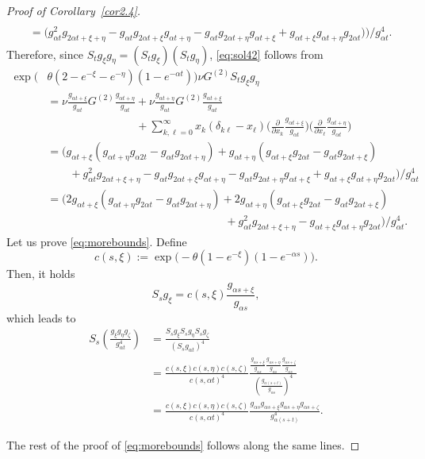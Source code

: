 \documentclass[10pt,a4paper]{amsart}
\begin{document}
\begin{proof}[Proof of Corollary~\ref{cor2.4}]
\begin{align*}
  \\ & = \Big(g_{\alpha t}^2 g_{2\alpha t+\xi+\eta} - g_{\alpha t} g_{2\alpha t+\xi} g_{\alpha t + \eta} - g_{\alpha t} g_{2\alpha t+\eta}g_{\alpha t + \xi} + g_{\alpha t +\xi}g_{\alpha t + \eta}g_{2\alpha t})\Big) / g_{\alpha t}^4.
\end{align*}
Therefore, since $S_t g_{ \xi} g_{ \eta} = (S_t g_{ \xi})(S_t g_{ \eta})$, \eqref{eq:sol42} follows from
\begin{align*}
    \exp\Big( & \theta(2 - e^{- \xi} - e^{- \eta})(1 - e^{-\alpha t}) \Big) \nu G^{(2)}S_t g_{ \xi} g_{ \eta}  \\ & = \nu\frac{g_{\alpha t + \xi}}{g_{\alpha t}} G^{(2)} \frac{g_{\alpha t + \eta}}{g_{\alpha t}} + \nu\frac{g_{\alpha t + \eta}}{g_{\alpha t}} G^{(2)} \frac{g_{\alpha t + \xi}}{g_{\alpha t}} \\ & \qquad \qquad \qquad \qquad + \sum_{k,\ell=0}^\infty 
    x_k(\delta_{k\ell} - x_\ell) \Big(\frac{\partial}{\partial x_k}\frac{g_{\alpha t + \xi}}{g_{\alpha t}} \Big) \Big(\frac{\partial}{\partial x_\ell} \frac{g_{\alpha t + \eta}}{g_{\alpha t}}\Big)
    \\ & = 
    \Big(g_{\alpha t + \xi}(g_{\alpha t + \eta}g_{\alpha 2t} - g_{\alpha t}g_{2\alpha t + \eta}) + g_{\alpha t + \eta} (g_{\alpha t + \xi}g_{2\alpha t} - g_{\alpha t}g_{2\alpha t+\xi}) \\ & \qquad + g_{\alpha t}^2 g_{2\alpha t+\xi+\eta} - g_{\alpha t} g_{2\alpha t+\xi}g_{\alpha t + \eta} - g_{\alpha t} g_{2\alpha t+\eta}g_{\alpha t + \xi} + g_{\alpha t +\xi}g_{\alpha t + \eta}g_{2\alpha t}\Big)/g_{\alpha t}^4 \\ & = \Big(
    2g_{\alpha t + \xi}(g_{\alpha t + \eta}g_{2\alpha t} - g_{\alpha t}g_{2\alpha t + \eta}) + 2g_{\alpha t + \eta}(g_{\alpha t + \xi}g_{2\alpha t} - g_{\alpha t}g_{2\alpha t+\xi}) \\ & \qquad \qquad \qquad \qquad \qquad \qquad \qquad \qquad + g_{\alpha t}^2 g_{2\alpha t+\xi+\eta} - g_{\alpha t + \xi}g_{\alpha t + \eta}g_{2\alpha t}\Big) / g_{\alpha t}^4.
\end{align*}
Let us prove \eqref{eq:morebounds}. Define
$$
c(s,\xi):=
\exp\Big(
-\theta(1-e^{-\xi})(1-e^{-\alpha s})
\Big).
$$
Then, it holds
$$
S_s g_{\xi}  =c(s,\xi)\frac{g_{\alpha s+\xi}  }{g_{\alpha s}  },
$$
which leads to
\begin{align*}
S_s\left(
\frac{
g_{\xi}g_{\eta}g_{\zeta}
}{g_{\alpha t}^4}
\right)  
&=
\frac{
S_s g_{\xi}  S_s g_{\eta}  S_s g_{\zeta}  
}{
(S_s g_{\alpha t}  )^4
} \\
&=
\frac{
c(s,\xi)c(s,\eta)c(s,\zeta)
}{
c(s,\alpha t)^4
}
\frac{
\frac{g_{\alpha s + \xi}  }{g_{\alpha s}  }
\frac{g_{\alpha s + \eta}  }{g_{\alpha s}  }
\frac{g_{\alpha s + \zeta}  }{g_{\alpha s}  }
}{
\left(\frac{g_{\alpha (s+t)}  }{g_{\alpha s}  }\right)^4
} \\
&=
\frac{
c(s,\xi)c(s,\eta)c(s,\zeta)
}{
c(s,\alpha t)^4
}
\frac{
g_{\alpha s}  g_{\alpha s + \xi}  g_{\alpha s + \eta}  g_{\alpha s + \zeta}  
}{
g_{\alpha (s+t)}  ^4
}.
\end{align*}

The rest of the proof of \eqref{eq:morebounds} follows along the same lines.
\end{proof}
\end{document}
